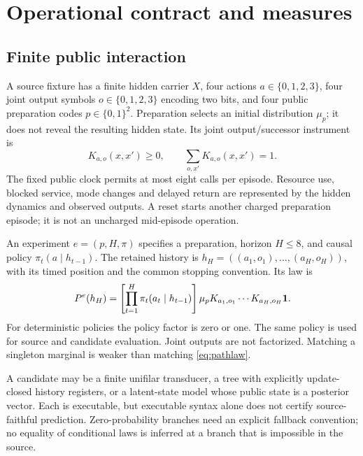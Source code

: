 \section{Operational contract and measures}\label{sec:contract}
\subsection{Finite public interaction}
A source fixture has a finite hidden carrier $X$, four actions $a\in\{0,1,2,3\}$, four joint output symbols $o\in\{0,1,2,3\}$ encoding two bits, and four public preparation codes $p\in\{0,1\}^2$. Preparation selects an initial distribution $\mu_p$; it does not reveal the resulting hidden state. Its joint output/successor instrument is
\begin{equation}
 K_{a,o}(x,x')\geq0,\qquad \sum_{o,x'}K_{a,o}(x,x')=1.
 \label{eq:instrument}
\end{equation}
The fixed public clock permits at most eight calls per episode. Resource use, blocked service, mode changes and delayed return are represented by the hidden dynamics and observed outputs. A reset starts another charged preparation episode; it is not an uncharged mid-episode operation.

An experiment $e=(p,H,\pi)$ specifies a preparation, horizon $H\leq8$, and causal policy $\pi_t(a\mid h_{t-1})$. The retained history is $h_H=((a_1,o_1),\ldots,(a_H,o_H))$, with its timed position and the common stopping convention. Its law is
\begin{equation}
 P^e(h_H)=\left[\prod_{t=1}^H\pi_t(a_t\mid h_{t-1})\right]
 \mu_p K_{a_1,o_1}\cdots K_{a_H,o_H}\mathbf 1 .
 \label{eq:pathlaw}
\end{equation}
For deterministic policies the policy factor is zero or one. The same policy is used for source and candidate evaluation. Joint outputs are not factorized. Matching a singleton marginal is weaker than matching \cref{eq:pathlaw}.

A candidate may be a finite unifilar transducer, a tree with explicitly update-closed history registers, or a latent-state model whose public state is a posterior vector. Each is executable, but executable syntax alone does not certify source-faithful prediction. Zero-probability branches need an explicit fallback convention; no equality of conditional laws is inferred at a branch that is impossible in the source.

